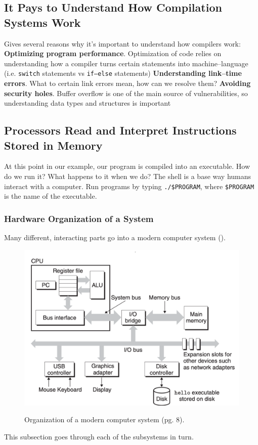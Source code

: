 \documentclass[../bryant_comp_sys.tex]{subfiles}
\begin{document}
    \subsection{It Pays to Understand How Compilation Systems Work}
        \begin{outline}
            \1 Gives several reasons why it's important to understand how compilers work:
                \2 \textbf{Optimizing program performance}. Optimization of code relies on understanding how a compiler turns certain statements into machine--language (i.e. \texttt{switch} statements vs \texttt{if--else} statements)
                \2 \textbf{Understanding link--time errors}. What to certain link errors mean, how can we resolve them?
                \2 \textbf{Avoiding security holes}. Buffer overflow is one of the main source of vulnerabilities, so understanding data types and structures is important
        \end{outline}

    \subsection{Processors Read and Interpret Instructions Stored in Memory}
        \begin{outline}
            \1 At this point in our example, our program is compiled into an executable.
            \1 How do we run it? What happens to it when we do?
            \1 The shell is a base way humans interact with a computer. Run programs by typing \texttt{./\$PROGRAM}, where \texttt{\$PROGRAM} is the name of the executable.
        \end{outline}

        \subsubsection{Hardware Organization of a System}
            \begin{outline}
                \1 Many different, interacting parts go into a modern computer system ().
                \begin{figure}
                    \centering
                    \includegraphics[width=0.5\linewidth]{ch1/figs/hardware_organization_1.png}
                    \label{fig:hardware_organization_1}
                    \caption{Organization of a modern computer system (pg. 8).}
                \end{figure}
                \1 This subsection goes through each of the subsystems in turn.
            \end{outline}
\end{document}
